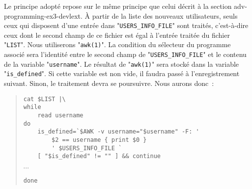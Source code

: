 Le principe adopt{\'e} repose sur le m{\^e}me principe que celui d{\'e}crit {\`a} la section
{adv-programming-ex3-devlext}. {\`A} partir de la liste des nouveaux utilisateurs, seuls
ceux qui disposent d'une entr{\'e}e dans "{\tt USERS\_INFO\_FILE}" sont trait{\'e}s,
c'est-{\`a}-dire ceux dont le second champ de ce fichier est {\'e}gal {\`a} l'entr{\'e}e trait{\'e}e
du fichier "{\tt LIST}". Nous utiliserons "{\tt awk(1)}". La condition du
s{\'e}lecteur du programme associ{\'e} sera l'identit{\'e} entre le second champ de
"{\tt USERS\_INFO\_FILE}" et le contenu de la variable "{\tt username}". Le
r{\'e}sultat de "{\tt awk(1)}" sera stock{\'e} dans la variable "{\tt is\_defined}".
Si cette variable est non vide, il faudra pass{\'e} {\`a} l'enregistrement suivant. Sinon, le
traitement devra se poursuivre. Nous aurons donc~:
\begin{quote}
\begin{verbatim}
cat $LIST |\
while
    read username
do
    is_defined=`$AWK -v username="$username" -F: '
        $2 == username { print $0 }
        ' $USERS_INFO_FILE `
    [ "$is_defined" != "" ] && continue
\end{verbatim}
$\cdots$
\begin{verbatim}
done
\end{verbatim}
\end{quote}

